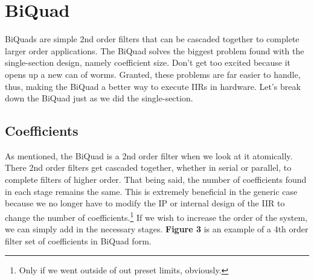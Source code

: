 \documentclass[12pt,a4paper,titlepage]{article}
\begin{document}
\section{BiQuad}
BiQuads are simple 2nd order filters that can be cascaded together to complete
larger order applications. The BiQuad solves the biggest problem found with the
single-section design, namely coefficient size. Don't get too excited because it
opens up a new can of worms. Granted, these problems are far easier to handle,
thus, making the BiQuad a better way to execute IIRs in hardware. Let's
break down the BiQuad just as we did the single-section.

\subsection{Coefficients}
As mentioned, the BiQuad is a 2nd order filter when we look at it
atomically. There 2nd order filters get cascaded together, whether in serial or
parallel, to complete filters of higher order. That being said, the number of
coefficients found in each stage remains the same. This is extremely beneficial
in the generic case because we no longer have to modify the IP or internal
design of the IIR to change the number of coefficients.\footnote{Only if we
  went outside of out preset limits, obviously.} If we wish to increase the
order of the system, we can simply add in the necessary stages. \textbf{Figure
  3} is an example of a 4th order filter set of coefficients in BiQuad form.
\end{document}
